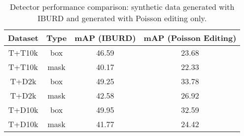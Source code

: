 \begin{table}[t]
    \caption{Detector performance comparison: synthetic data generated with IBURD and generated with Poisson editing only.}
    \centering
    \begin{tabular}{cccc}
    \toprule
         Dataset & Type & mAP (IBURD) & mAP (Poisson Editing)  \\ \midrule
         T+T10k &box& 46.59 & 23.68\\ 
         T+T10k &mask& 40.17& 22.33\\ 
         T+D2k& box & 49.25 & 33.78 \\ 
         T+D2k& mask & 42.58 & 26.92  \\ 
         T+D10k& box & 49.95 & 32.59  \\ 
         T+D10k& mask & 41.77 & 24.42  \\  \bottomrule

    \end{tabular}
    \label{tab:ablation}
    
\end{table}